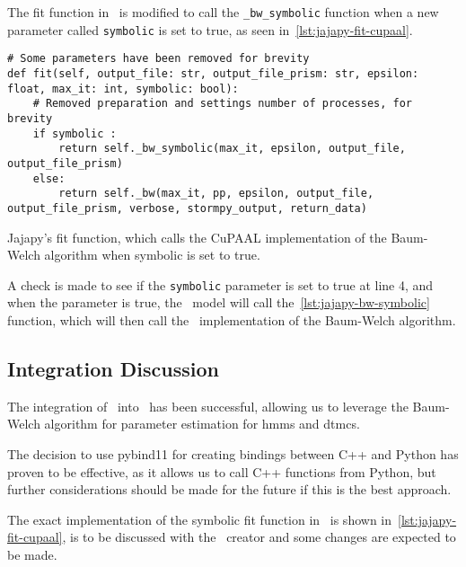 The fit function in \Jajapy\ is modified to call the \texttt{\_bw\_symbolic} function when a new parameter called \texttt{symbolic} is set to true, as seen in~\autoref{lst:jajapy-fit-cupaal}.


\begin{listing}
    \begin{verbatim}
# Some parameters have been removed for brevity
def fit(self, output_file: str, output_file_prism: str, epsilon: float, max_it: int, symbolic: bool):
    # Removed preparation and settings number of processes, for brevity
    if symbolic :
        return self._bw_symbolic(max_it, epsilon, output_file, output_file_prism)
    else:
        return self._bw(max_it, pp, epsilon, output_file, output_file_prism, verbose, stormpy_output, return_data)
      \end{verbatim}
    \caption{Jajapy's fit function, which calls the CuPAAL implementation of the Baum-Welch algorithm when symbolic is set to true.}
    \label{lst:jajapy-fit-cupaal}
\end{listing}

A check is made to see if the \texttt{symbolic} parameter is set to true at line 4, and when the parameter is true, the \Jajapy\ model will call the~\autoref{lst:jajapy-bw-symbolic} function, which will then call the \Cupaal\ implementation of the Baum-Welch algorithm.

\subsection{Integration Discussion}\label{subsec:integration-discussion}
The integration of \Cupaal\ into \Jajapy\ has been successful, allowing us to leverage the Baum-Welch algorithm for parameter estimation for \glspl{hmm} and \glspl{dtmc}.

The decision to use pybind11 for creating bindings between C++ and Python has proven to be effective, as it allows us to call C++ functions from Python, but further considerations should be made for the future if this is the best approach.

The exact implementation of the symbolic fit function in \Jajapy\ is shown in~\autoref{lst:jajapy-fit-cupaal}, is to be discussed with the \Jajapy\ creator and some changes are expected to be made.

